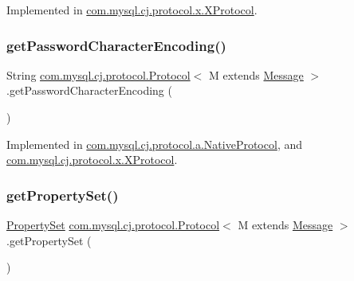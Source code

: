 Implemented in \mbox{\hyperlink{classcom_1_1mysql_1_1cj_1_1protocol_1_1x_1_1_x_protocol_ac97de7fb2df918128b58d1d6c1dcf2fa}{com.\+mysql.\+cj.\+protocol.\+x.\+X\+Protocol}}.

\mbox{\label{interfacecom_1_1mysql_1_1cj_1_1protocol_1_1_protocol_a60c0f5b5a210c088b9bf761e828031b1}} 
\subsubsection{\texorpdfstring{get\+Password\+Character\+Encoding()}{getPasswordCharacterEncoding()}}
{\footnotesize\ttfamily String \mbox{\hyperlink{interfacecom_1_1mysql_1_1cj_1_1protocol_1_1_protocol}{com.\+mysql.\+cj.\+protocol.\+Protocol}}$<$ M extends \mbox{\hyperlink{interfacecom_1_1mysql_1_1cj_1_1protocol_1_1_message}{Message}} $>$.get\+Password\+Character\+Encoding (\begin{DoxyParamCaption}{ }\end{DoxyParamCaption})}



Implemented in \mbox{\hyperlink{classcom_1_1mysql_1_1cj_1_1protocol_1_1a_1_1_native_protocol_a616ff80ada9364f47f0282b2046c9b82}{com.\+mysql.\+cj.\+protocol.\+a.\+Native\+Protocol}}, and \mbox{\hyperlink{classcom_1_1mysql_1_1cj_1_1protocol_1_1x_1_1_x_protocol_afb296fd1ce274c0cb1fc920ce64220fe}{com.\+mysql.\+cj.\+protocol.\+x.\+X\+Protocol}}.

\mbox{\label{interfacecom_1_1mysql_1_1cj_1_1protocol_1_1_protocol_a131dda37d8f18893894e2671d4c18005}} 
\subsubsection{\texorpdfstring{get\+Property\+Set()}{getPropertySet()}}
{\footnotesize\ttfamily \mbox{\hyperlink{interfacecom_1_1mysql_1_1cj_1_1conf_1_1_property_set}{Property\+Set}} \mbox{\hyperlink{interfacecom_1_1mysql_1_1cj_1_1protocol_1_1_protocol}{com.\+mysql.\+cj.\+protocol.\+Protocol}}$<$ M extends \mbox{\hyperlink{interfacecom_1_1mysql_1_1cj_1_1protocol_1_1_message}{Message}} $>$.get\+Property\+Set (\begin{DoxyParamCaption}{ }\end{DoxyParamCaption})}

